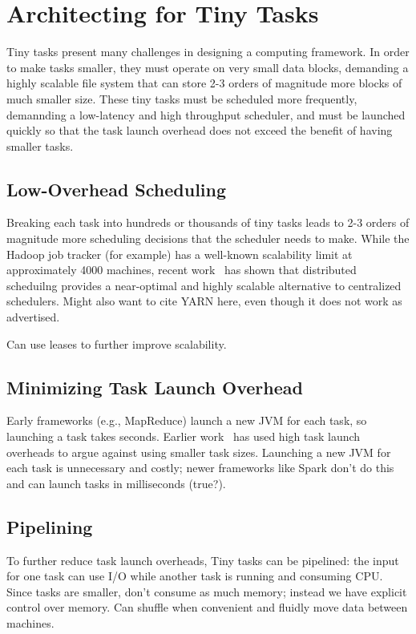 \section{Architecting for Tiny Tasks}

Tiny tasks present many challenges in designing a computing framework.
In order to make tasks smaller, they must operate on very small data blocks,
demanding a highly scalable file system that can store 2-3 orders of magnitude
more blocks of much smaller size.  These tiny tasks must be scheduled more
frequently, demannding a low-latency and high throughput scheduler, and
must be launched quickly so that the task launch overhead does not
exceed the benefit of having smaller tasks.

\subsection{Low-Overhead Scheduling}
Breaking each task into hundreds or thousands of tiny tasks leads to 2-3 orders
of magnitude more scheduling decisions that the scheduler needs to make.
While the Hadoop job tracker (for example) has a well-known scalability limit
at approximately 4000 machines, recent work~\cite{sparrow} has shown that
distributed scheduilng provides a near-optimal and highly scalable alternative
to centralized schedulers. Might also want to cite YARN here, even though it
does not work as advertised.

Can use leases to further improve scalability.

\subsection{Minimizing Task Launch Overhead}
Early frameworks (e.g., MapReduce) launch a
new JVM for each task, so launching a task takes seconds.  Earlier
work~\cite{Amoeba} has used high task launch overheads to argue against
using smaller task sizes.  Launching a new JVM for each task is
unnecessary and costly; newer frameworks like Spark don't do this and can
launch tasks in milliseconds (true?).

\subsection{Pipelining}
To further reduce task launch overheads, Tiny tasks can be pipelined: the input for one task can use I/O while another task is running and consuming CPU.  Since
tasks are smaller, don't consume as much memory; instead we have explicit
control over memory.  Can shuffle when convenient and fluidly move data
between machines.

